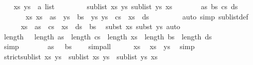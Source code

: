 \begin{isabellebody}
\isanewline
\ \ \isamarkupfalse%
\ xs\ ys\ {\isacharcolon}{\isacharcolon}\ {\isachardoublequoteopen}{\isacharprime}a\ list{\isachardoublequoteclose}\isanewline
\ \ \isacommand{{\isacharbraceleft}}\isamarkupfalse%
\isanewline
\ \ \ \ \isamarkupfalse%
\ {\isachardoublequoteopen}sublist\ xs\ ys{\isachardoublequoteclose}\ {\isachardoublequoteopen}sublist\ ys\ xs{\isachardoublequoteclose}\isanewline
\ \ \ \ \isamarkupfalse%
\ \isamarkupfalse%
\ as\ bs\ cs\ ds\ \isanewline
\ \ \ \ \ \ \ xs{\isacharcolon}\ {\isachardoublequoteopen}xs\ {\isacharequal}\ as\ {\isacharat}\ ys\ {\isacharat}\ bs{\isachardoublequoteclose}\ \ ys{\isacharcolon}\ {\isachardoublequoteopen}ys\ {\isacharequal}\ cs\ {\isacharat}\ xs\ {\isacharat}\ ds{\isachardoublequoteclose}\ \isanewline
\ \ \ \ \ \ \isamarkupfalse%
\ {\isacharparenleft}auto\ simp{\isacharcolon}\ sublist{\isacharunderscore}def{\isacharparenright}\isanewline
\ \ \ \ \isamarkupfalse%
\ {\isachardoublequoteopen}xs\ {\isacharequal}\ as\ {\isacharat}\ cs\ {\isacharat}\ xs\ {\isacharat}\ ds\ {\isacharat}\ bs{\isachardoublequoteclose}\ \isamarkupfalse%
\ {\isacharparenleft}subst\ xs{\isacharcomma}\ subst\ ys{\isacharparenright}\ auto\isanewline
\ \ \ \ \isamarkupfalse%
\ \isamarkupfalse%
\ {\isachardoublequoteopen}length\ {\isasymdots}\ {\isacharequal}\ length\ as\ {\isacharplus}\ length\ cs\ {\isacharplus}\ length\ xs\ {\isacharplus}\ length\ bs\ {\isacharplus}\ length\ ds{\isachardoublequoteclose}\ \isanewline
\ \ \ \ \ \ \isamarkupfalse%
\ simp\isanewline
\ \ \ \ \isamarkupfalse%
\ \isamarkupfalse%
\ {\isachardoublequoteopen}as\ {\isacharequal}\ {\isacharbrackleft}{\isacharbrackright}{\isachardoublequoteclose}\ {\isachardoublequoteopen}bs\ {\isacharequal}\ {\isacharbrackleft}{\isacharbrackright}{\isachardoublequoteclose}\ \isamarkupfalse%
\ simp{\isacharunderscore}all\isanewline
\ \ \ \ \isamarkupfalse%
\ xs\ \isamarkupfalse%
\ {\isachardoublequoteopen}xs\ {\isacharequal}\ ys{\isachardoublequoteclose}\ \isamarkupfalse%
\ simp\isanewline
\ \ \isacommand{{\isacharbraceright}}\isamarkupfalse%
\isanewline
\ \ \isamarkupfalse%
\ {\isachardoublequoteopen}strict{\isacharunderscore}sublist\ xs\ ys\ {\isasymlongleftrightarrow}\ {\isacharparenleft}sublist\ xs\ ys\ {\isasymand}\ {\isasymnot}sublist\ ys\ xs{\isacharparenright}{\isachardoublequoteclose}\isanewline

\end{isabellebody}
